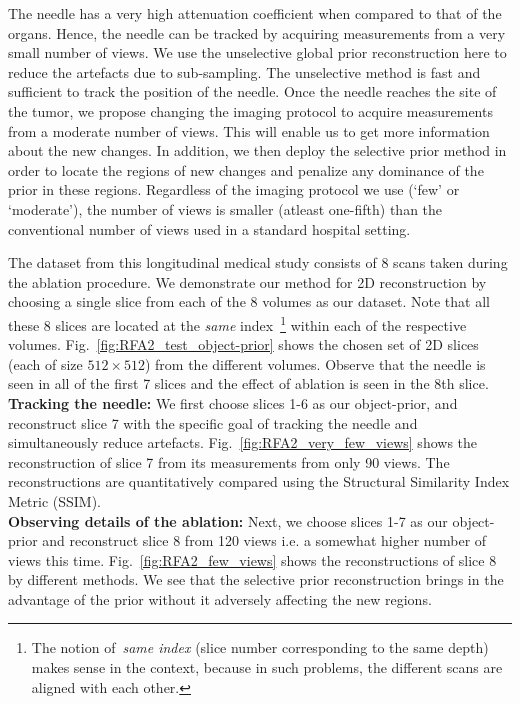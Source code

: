 \documentclass[journal]{IEEEtran}
\begin{document}
The needle has a very high attenuation coefficient when compared to that of the organs. Hence, the needle can be tracked by acquiring measurements from a very small number of views. We use the unselective global prior reconstruction here to reduce the artefacts due to sub-sampling. The unselective method is fast and sufficient to track the position of the needle.  Once the needle reaches the site of the tumor, we propose changing the imaging protocol to acquire measurements from a moderate number of views. This will enable us to get more information about the new changes. In addition, we then deploy the selective prior method in order to locate the regions of new changes and penalize any dominance of the prior in these regions.  Regardless of the imaging protocol we use (`few' or `moderate'), the number of views is smaller (atleast one-fifth) than the conventional number of views used in a standard hospital setting.

The dataset from this longitudinal medical study consists of 8 scans taken during the ablation procedure. We demonstrate our method for 2D reconstruction by choosing a single slice from each of the 8 volumes as our dataset. Note that all these 8 slices are located at the \emph{same} index~\footnote{The notion of~\textit{same index} (slice number corresponding to the same depth) makes sense in the context, because in such problems, the different scans are aligned with each other.} within each of the respective volumes. Fig.~\ref{fig:RFA2_test_object-prior} shows the chosen set of 2D slices (each of size $512 \times 512$) from the different volumes. Observe that the needle is seen in all of the first 7 slices  and the effect of ablation is seen in the 8th slice. \\

\textbf{Tracking the needle:} We first choose slices 1-6 as our object-prior, and reconstruct slice 7 with the specific goal of tracking the needle and simultaneously reduce artefacts. Fig.~\ref{fig:RFA2_very_few_views} shows the reconstruction of slice 7 from its measurements from only 90 views. The reconstructions are quantitatively compared using the Structural Similarity Index Metric (SSIM).\\ 

\textbf{Observing details of the ablation:} Next, we choose slices 1-7 as our object-prior and reconstruct slice 8 from 120 views i.e. a somewhat higher number of views this time. Fig.~\ref{fig:RFA2_few_views} shows the reconstructions of slice 8 by different methods. We see that the selective prior reconstruction brings in the advantage of the prior without it adversely affecting the new regions.
\end{document}
